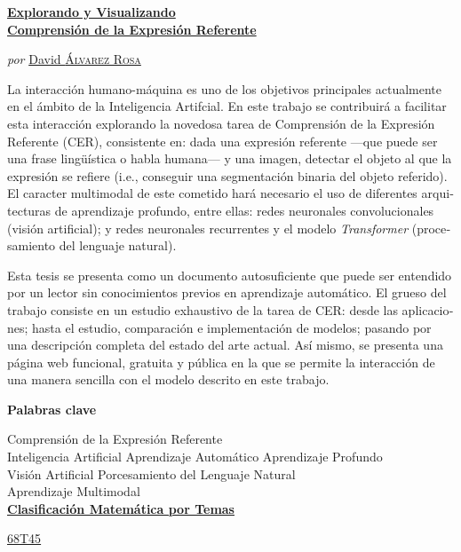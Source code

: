 \begin{otherlanguage}{spanish}
  \begin{center}
    \Large
    \href{https://recomprehension.com/}{\textbf{Explorando y Visualizando\\
        Comprensión de la Expresión Referente}}

    \vspace{2ex} \large \textit{por}
    \href{https://david.alvarezrosa.com/}{David \textsc{Álvarez Rosa}}

    \vspace{3ex} \textbf{\abstractname}
  \end{center}

  \vspace{-2ex}
  \noindent La interacción humano-máquina es uno de los objetivos principales
  actualmente en el ámbito de la Inteligencia Artifcial. En este trabajo se
  contribuirá a facilitar esta interacción explorando la novedosa tarea de
  Comprensión de la Expresión Referente (CER), consistente en: dada una
  expresión referente ---que puede ser una frase lingüística o habla humana---
  y una imagen, detectar el objeto al que la expresión se refiere (i.e.,
  conseguir una segmentación binaria del objeto referido). El caracter
  multimodal de este cometido hará necesario el uso de diferentes arquitecturas
  de aprendizaje profundo, entre ellas: redes neuronales convolucionales
  (visión artificial); y redes neuronales recurrentes y el modelo
  \textit{Transformer} (procesamiento del lenguaje natural).

  Esta tesis se presenta como un documento autosuficiente que puede ser
  entendido por un lector sin conocimientos previos en aprendizaje
  automático. El grueso del trabajo consiste en un estudio exhaustivo de la
  tarea de CER: desde las aplicaciones; hasta el estudio, comparación e
  implementación de modelos; pasando por una descripción completa del estado
  del arte actual. Así mismo, se presenta una página web funcional, gratuita y
  pública en la que se permite la interacción de una manera sencilla con el
  modelo descrito en este trabajo.

  \begin{center}


    \bigskip\smallskip \textbf{Palabras clave}

    Comprensión de la Expresión Referente\\
    Inteligencia Artificial \textbullet{} Aprendizaje Automático \textbullet{}
    Aprendizaje Profundo\\
    Visión Artificial \textbullet{} Porcesamiento del Lenguaje Natural\\
    Aprendizaje Multimodal\\

    \bigskip
    \href{https://mathscinet.ams.org/msc/msc2010.html}{\textbf{Clasificación
        Matemática por Temas}}

    \href{https://mathscinet.ams.org/msc/msc2010.html?t=68Txx}{68T45}
  \end{center}
\end{otherlanguage}
\vfill\null{}


